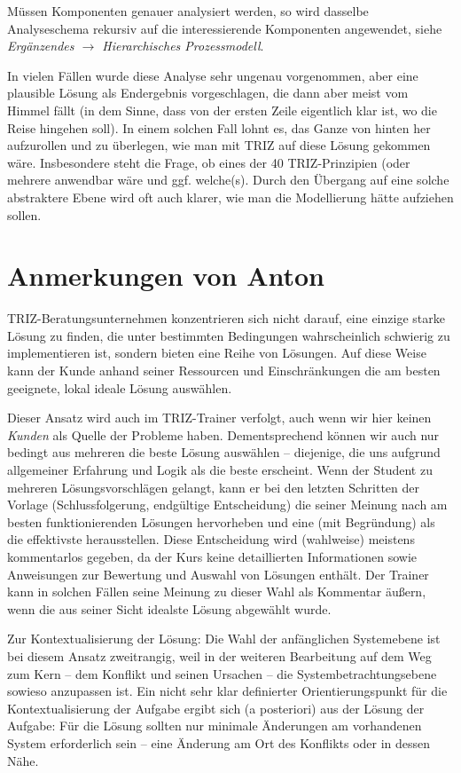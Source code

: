 \documentclass[11pt,a4paper]{article}
\begin{document}
Müssen Komponenten genauer analysiert werden, so wird dasselbe Analyseschema
rekursiv auf die interessierende Komponenten angewendet, siehe
\emph{Ergänzendes $\to$ Hierarchisches Prozessmodell}.

In vielen Fällen wurde diese Analyse sehr ungenau vorgenommen, aber eine
plausible Lösung als Endergebnis vorgeschlagen, die dann aber meist vom Himmel
fällt (in dem Sinne, dass von der ersten Zeile eigentlich klar ist, wo die
Reise hingehen soll). In einem solchen Fall lohnt es, das Ganze von hinten her
aufzurollen und zu überlegen, wie man mit TRIZ auf diese Lösung gekommen
wäre. Insbesondere steht die Frage, ob eines der 40 TRIZ-Prinzipien (oder
mehrere anwendbar wäre und ggf. welche(s). Durch den Übergang auf eine solche
abstraktere Ebene wird oft auch klarer, wie man die Modellierung hätte
aufziehen sollen. 


\section{Anmerkungen von Anton}

TRIZ-Beratungsunternehmen konzentrieren sich nicht darauf, eine einzige starke
Lösung zu finden, die unter bestimmten Bedingungen wahrscheinlich schwierig zu
implementieren ist, sondern bieten eine Reihe von Lösungen. Auf diese Weise
kann der Kunde anhand seiner Ressourcen und Einschränkungen die am besten
geeignete, lokal ideale Lösung auswählen.
 
Dieser Ansatz wird auch im TRIZ-Trainer verfolgt, auch wenn wir hier keinen
\emph{Kunden} als Quelle der Probleme haben. Dementsprechend können wir auch
nur bedingt aus mehreren die beste Lösung auswählen -- diejenige, die uns
aufgrund allgemeiner Erfahrung und Logik als die beste erscheint. Wenn der
Student zu mehreren Lösungsvorschlägen gelangt, kann er bei den letzten
Schritten der Vorlage (Schlussfolgerung, endgültige Entscheidung) die seiner
Meinung nach am besten funktionierenden Lösungen hervorheben und eine (mit
Begründung) als die effektivste herausstellen. Diese Entscheidung wird
(wahlweise) meistens kommentarlos gegeben, da der Kurs keine detaillierten
Informationen sowie Anweisungen zur Bewertung und Auswahl von Lösungen
enthält. Der Trainer kann in solchen Fällen seine Meinung zu dieser Wahl als
Kommentar äußern, wenn die aus seiner Sicht idealste Lösung abgewählt wurde.
 
Zur Kontextualisierung der Lösung: Die Wahl der anfänglichen Systemebene ist
bei diesem Ansatz zweitrangig, weil in der weiteren Bearbeitung auf dem Weg
zum Kern -- dem Konflikt und seinen Ursachen -- die Systembetrachtungsebene
sowieso anzupassen ist. Ein nicht sehr klar definierter Orientierungspunkt für
die Kontextualisierung der Aufgabe ergibt sich (a posteriori) aus der Lösung
der Aufgabe: Für die Lösung sollten nur minimale Änderungen am vorhandenen
System erforderlich sein -- eine Änderung am Ort des Konflikts oder in dessen
Nähe.
\end{document}
